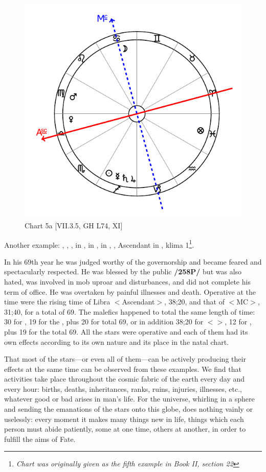 \begin{figure}
\centering
\vspace{-20pt}
\includegraphics[width=.68\textwidth]{charts/2_21_5}
\caption{Chart 5a [VII.3.5, GH L74, XI]}
\label{fig:chart5a}
\end{figure} 

Another example: \Sun, \Saturn, \Jupiter, \Mercury\xspace in \Sagittarius, \Moon\xspace in \Cancer, \Mars\xspace in \Virgo,
\Venus, Ascendant in \Libra, klima 1\footnote{\textit{Chart was originally given as the fifth example in Book II, section 22}}.

In his 69th year he was judged worthy of the governorship and became feared and spectacularly respected. He was blessed by the public \textbf{/258P/} but was also hated, was involved in mob uproar and disturbances, and did not complete his term of office. He was overtaken by painful illnesses and death. Operative at the time were the rising time of Libra $<$Ascendant$>$, 38;20, and
that of \Cancer\xspace $<$MC$>$, 31;40, for a total of 69. The malefics happened to total the same length of time: 30 for \Saturn, 19 for the \Sun, plus 20 for \Mercury\xspace total 69, or in addition 38;20 for \Virgo $<$\Mars$>$, 12 for \Jupiter, plus 19 for the \Sun\xspace total 69. All the stars were operative and each of them had its own effects according to its own nature and its place in the natal chart.

That most of the stars—or even all of them—can be actively producing their effects at the same time can be observed from these examples. We find that activities take place throughout the cosmic fabric of the
earth every day and every hour: births, deaths, inheritances, ranks, ruins, injuries, illnesses, etc., whatever good or bad arises in man’s life. For the universe, whirling in a sphere and sending the emanations of the stars onto this globe, does nothing vainly or uselessly: every moment it makes many things new in life, things which each person must abide patiently, some at one time, others at another, in order to fulfill the aims of Fate.

